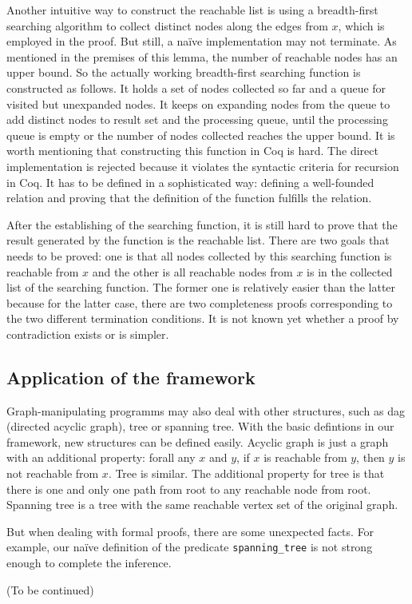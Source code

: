 Another intuitive way to construct the reachable list is using a
breadth-first searching algorithm to collect distinct nodes along the
edges from $x$, which is employed in the proof. But still, a na\"ive
implementation may not terminate. As mentioned in the premises of this
lemma, the number of reachable nodes has an upper bound. So the
actually working breadth-first searching function is constructed as
follows. It holds a set of nodes collected so far and a queue for
visited but unexpanded nodes. It keeps on expanding nodes from the
queue to add distinct nodes to result set and the processing queue,
until the processing queue is empty or the number of nodes collected
reaches the upper bound. It is worth mentioning that constructing this
function in Coq is hard. The direct implementation is rejected because
it violates the syntactic criteria for recursion in Coq. It has to be
defined in a sophisticated way: defining a well-founded relation and
proving that the definition of the function fulfills the relation.

After the establishing of the searching function, it is still hard to
prove that the result generated by the function is the reachable
list. There are two goals that needs to be proved: one is that all
nodes collected by this searching function is reachable from $x$ and
the other is all reachable nodes from $x$ is in the
collected list of the searching function. The former one is relatively
easier than the latter because for the latter case, there are two
completeness proofs corresponding to the two different termination
conditions. It is not known yet whether a proof by contradiction
exists or is simpler.

\subsection{Application of the framework}

Graph-manipulating programms may also deal with other structures, such
as dag (directed acyclic graph), tree or spanning tree. With the basic
defintions in our framework, new structures can be defined
easily. Acyclic graph is just a graph with an additional property:
forall any $x$ and $y$, if $x$ is reachable from $y$, then $y$ is not
reachable from $x$. Tree is similar. The additional property for tree
is that there is one and only one path from root to any reachable node
from root. Spanning tree is a tree with the same reachable vertex set
of the original graph.

But when dealing with formal proofs, there are some unexpected
facts. For example, our na\"ive definition of the
predicate \verb|spanning_tree| is not strong enough to complete the
inference.

(To be continued)
